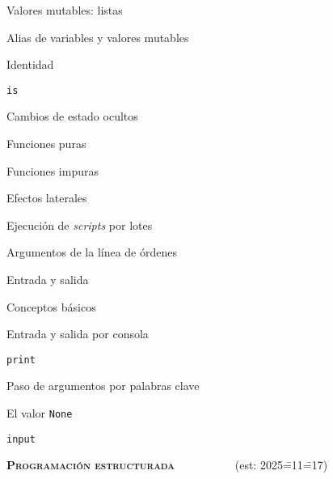 \begin{longenum}
\begin{longenum}
\begin{longenum}
\begin{longenum}
\begin{longenum}
                \end{longenum}
                \item Valores mutables: listas
            \end{longenum}
            \item Alias de variables y valores mutables
            \item Identidad
            \begin{longenum}
                \item \texttt{is}
            \end{longenum}
        \end{longenum}
        \item Cambios de estado ocultos
        \begin{longenum}
            \item Funciones puras
            \item Funciones impuras
            \item Efectos laterales
            \item Ejecución de \textit{scripts} por lotes
            \begin{longenum}
                \item Argumentos de la línea de órdenes
            \end{longenum}
        \end{longenum}
        \item Entrada y salida
        \begin{longenum}
            \item Conceptos básicos
            \item Entrada y salida por consola
            \begin{longenum}
                \item \texttt{print}
                \begin{longenum}
                    \item Paso de argumentos por palabras clave
                    \item El valor \texttt{None}
                \end{longenum}
                \item \texttt{input}
            \end{longenum}
        \end{longenum}
    \end{longenum}
    \item \textbf{\textsc{Programación estructurada}} \ \ \ \ \ \ \ \ \ \ (est: 2025\==11\==17)

\end{longenum}
